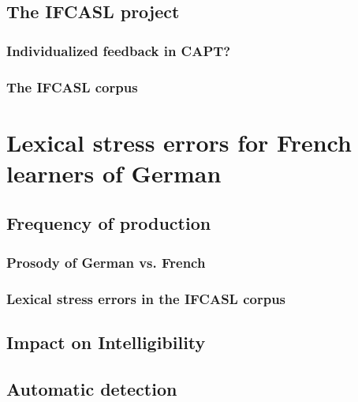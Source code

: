 	\section{The IFCASL project}
		\subsection{Individualized feedback in CAPT?}
		\subsection{The IFCASL corpus}


\chapter{Lexical stress errors for French learners of German}
	\blindtext
	\section{Frequency of production}
		\subsection{Prosody of German vs. French }
		\subsection{Lexical stress errors in the IFCASL corpus} 
	\section{Impact on Intelligibility}
	\section{Automatic detection}